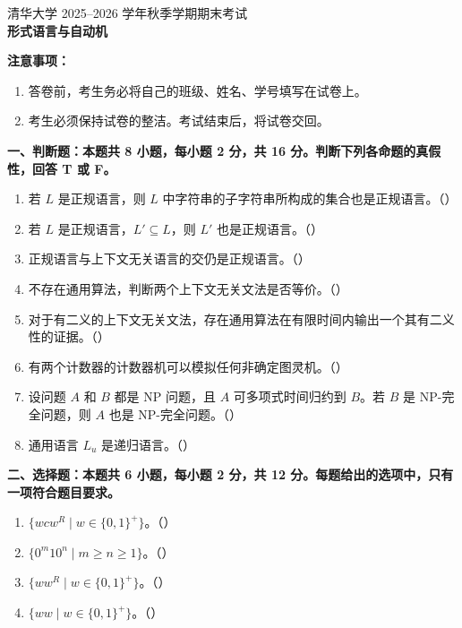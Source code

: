 \documentclass[UTF8,zihao=5]{ctexart}
\newcommand{\ansbox}{\hfill（\hspace{1.6em}）}
\newcommand{\examsection}[2]{\par\medskip\noindent\textbf{#1：#2}\par}
\begin{document}
\begin{center}
  {\large 清华大学 2025--2026 学年秋季学期期末考试}\\[0.4em]
  {\LARGE \bfseries 形式语言与自动机}
\end{center}

\textbf{注意事项：}
\begin{enumerate}[label=(\arabic*)]
  \item 答卷前，考生务必将自己的班级、姓名、学号填写在试卷上。
  \item 考生必须保持试卷的整洁。考试结束后，将试卷交回。
\end{enumerate}

\examsection{一、判断题}{本题共 8 小题，每小题 2 分，共 16 分。判断下列各命题的真假性，回答 T 或 F。}

\begin{enumerate}
  \item 若 $L$ 是正规语言，则 $L$ 中字符串的子字符串所构成的集合也是正规语言。\ansbox
  \item 若 $L$ 是正规语言，$L' \subseteq L$，则 $L'$ 也是正规语言。\ansbox
  \item 正规语言与上下文无关语言的交仍是正规语言。\ansbox
  \item 不存在通用算法，判断两个上下文无关文法是否等价。\ansbox
  \item 对于有二义的上下文无关文法，存在通用算法在有限时间内输出一个其有二义性的证据。\ansbox
  \item 有两个计数器的计数器机可以模拟任何非确定图灵机。\ansbox
  \item 设问题 $A$ 和 $B$ 都是 NP 问题，且 $A$ 可多项式时间归约到 $B$。若 $B$ 是 NP-完全问题，则 $A$ 也是 NP-完全问题。\ansbox
  \item 通用语言 $L_u$ 是递归语言。\ansbox
\end{enumerate}

\examsection{二、选择题}{本题共 6 小题，每小题 2 分，共 12 分。每题给出的选项中，只有一项符合题目要求。}

\begin{enumerate}[resume]
  \item $\{wcw^R \mid w\in\{0,1\}^+\}$。\ansbox
  \item $\{0^m10^n \mid m\ge n\ge 1\}$。\ansbox
  \item $\{ww^R \mid w\in\{0,1\}^+\}$。\ansbox
  \item $\{ww \mid w\in\{0,1\}^+\}$。\ansbox
\end{enumerate}
\end{document}

